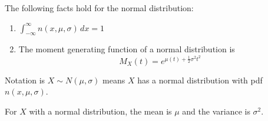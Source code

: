 \documentclass[11pt]{article}
\begin{document}
\begin{theorem}The following facts hold for the normal distribution:
    \begin{enumerate}
        \item $\int_{-\infty}^{\infty} n(x,\mu,\sigma)\, dx = 1$
        \item The moment generating function of a normal distribution is 
        \[
            M_X(t) = e^{\mu(t)+\frac{1}{2}\sigma^2t^2}
        \]
        
    \end{enumerate}
    
\end{theorem}

\begin{definition}
    Notation is $X \sim N(\mu, \sigma)$ means $X$ has a normal distribution with pdf $n(x,\mu,\sigma)$.
\end{definition}

\begin{theorem}
    For $X$ with a normal distribution, the mean is $\mu$ and the variance is $\sigma^2$.
\end{theorem}
\end{document}
